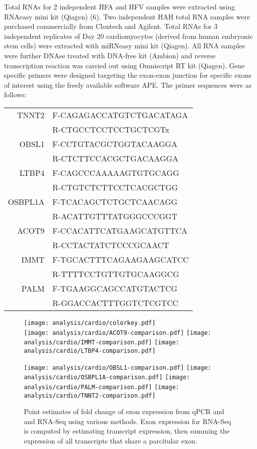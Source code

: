 \documentclass{article}
\begin{document}
Total RNAs for 2 independent HFA and HFV samples were extracted using RNAeasy
mini kit (Qiagen) (6). Two independent HAH total RNA samples were purchased
commercially from Clontech and Agilent. Total RNAs for 3 independent replicates
of Day 20 cardiomyocytes (derived from human embryonic stem cells) were
extracted with miRNeasy mini kit (Qiagen). All RNA samples were further DNAse
treated with DNA-free kit (Ambion) and reverse transcription reaction was
carried out using Omniscript RT kit (Qiagen). Gene specific primers were
designed targeting the exon-exon junction for specific exons of interest using
the freely available software APE. The primer sequences were as follows:

\begin{center}
\begin{tabular}{rl}
TNNT2   & F-CAGAGACCATGTCTGACATAGA \\
        & R-CTGCCTCCTCCTGCTCGTx \\
OBSL1   & F-CCTGTACGCTGGTACAAGGA \\
        & R-CTCTTCCACGCTGACAAGGA \\
LTBP4   & F-CAGCCCAAAAAGTGTGCAGG \\
        & R-CTGTCTCTTCCTCACGCTGG \\
OSBPL1A & F-TCACAGCTCTGCTCAACAGG \\
        & R-ACATTGTTTATGGGCCCGGT \\
ACOT9   & F-CCACATTCATGAAGCATGTTCA \\
        & R-CCTACTATCTCCCGCAACT \\
IMMT    & F-TGCACTTTCAGAAGAAGCATCC \\
        & R-TTTTCCTGTTGTGCAAGGCG \\
PALM    & F-TGAAGGCAGCCATGTACTCG \\
        & R-GGACCACTTTGGTCTCGTCC
\end{tabular}
\end{center}

\begin{figure}[H]
\texttt{[image: analysis/cardio/colorkey.pdf]} \\
\texttt{[image: analysis/cardio/ACOT9-comparison.pdf]}
\texttt{[image: analysis/cardio/IMMT-comparison.pdf]}
\texttt{[image: analysis/cardio/LTBP4-comparison.pdf]}
\end{figure}
\begin{figure}[H]
\ContinuedFloat
\texttt{[image: analysis/cardio/OBSL1-comparison.pdf]}
\texttt{[image: analysis/cardio/OSBPL1A-comparison.pdf]}
\texttt{[image: analysis/cardio/PALM-comparison.pdf]}
\texttt{[image: analysis/cardio/TNNT2-comparison.pdf]}
\caption{Point estimates of fold change of exon expression from qPCR and and
RNA-Seq using various methods. Exon expression for RNA-Seq is computed by
estimating transcript expression, then summing the expression of all transcripts
that share a parcitular exon.}
\label{fig:cardiofoldchange}
\end{figure}
\end{document}
